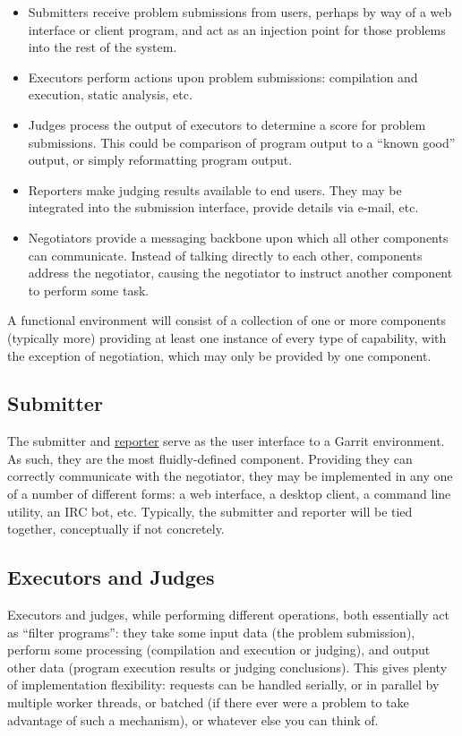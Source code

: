 \documentclass[11pt,letterpaper]{article}
\begin{document}
\begin{itemize}
\item Submitters receive problem submissions from users, perhaps by way of a
web interface or client program, and act as an injection point for those
problems into the rest of the system.
\item Executors perform actions upon problem submissions: compilation and
execution, static analysis, etc.
\item Judges process the output of executors to determine a score for problem
submissions. This could be comparison of program output to a ``known good''
output, or simply reformatting program output.
\item Reporters make judging results available to end users. They may be
integrated into the submission interface, provide details via e-mail, etc.
\item Negotiators provide a messaging backbone upon which all other components
can communicate. Instead of talking directly to each other, components address
the negotiator, causing the negotiator to instruct another component to perform
some task.
\end{itemize}

A functional environment will consist of a collection of one or more components
(typically more) providing at least one instance of every type of capability,
with the exception of negotiation, which may only be provided by one component.

\subsection{Submitter}
\label{design-submitter}

The submitter and \hyperref[design-reporter]{reporter} serve as the user
interface to a Garrit environment. As such, they are the most fluidly-defined
component. Providing they can correctly communicate with the negotiator, they
may be implemented in any one of a number of different forms: a web interface,
a desktop client, a command line utility, an IRC bot, etc. Typically, the
submitter and reporter will be tied together, conceptually if not concretely.

\subsection{Executors and Judges}
\label{design-executor-judge}

Executors and judges, while performing different operations, both essentially
act as ``filter programs'': they take some input data (the problem submission),
perform some processing (compilation and execution or judging), and output
other data (program execution results or judging conclusions). This gives
plenty of implementation flexibility: requests can be handled serially, or in
parallel by multiple worker threads, or batched (if there ever were a problem
to take advantage of such a mechanism), or whatever else you can think of.
\end{document}
